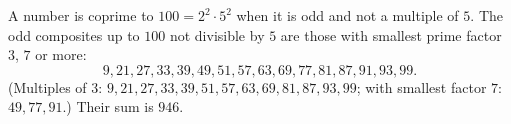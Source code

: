 A number is coprime to $100=2^2\cdot5^2$ when it is odd and not a multiple of $5$. The odd composites up to $100$ not divisible by $5$ are those with smallest prime factor $3$, $7$ or more:
\[
9,21,27,33,39,49,51,57,63,69,77,81,87,91,93,99 .
\]
(Multiples of $3$: $9,21,27,33,39,51,57,63,69,81,87,93,99$; with smallest factor $7$: $49,77,91$.) Their sum is $\boxed{946}$.
